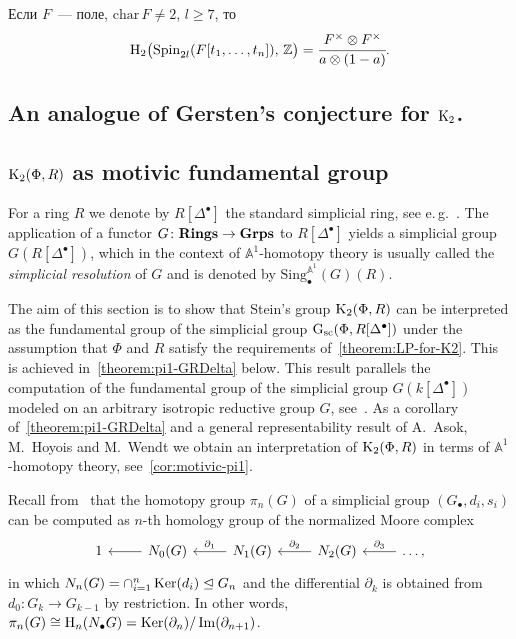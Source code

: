 \documentclass[oneside, 11pt]{amsart} \pdfoutput=1
\begin{document}
\begin{corollary}
Если $F$~--- поле, $\mathrm{char}\,F\neq2$, $l\geq7$, то
$$
\mathrm H_2\big(\mathrm{Spin}_{2l}(F[t_1,\ldots,t_n]),\,\mathbb Z\big)=\cfrac{F^\times\otimes F^\times}{a\otimes(1-a)}.
$$
\end{corollary}
\subsection{An analogue of Gersten's conjecture for ${\mathrm{K}}_2$.}

\subsection{\texorpdfstring{${\mathrm{K}}_2(\Phi, R)$}{K2(R)} as motivic fundamental group}
For a ring $R$ we denote by $R[\Delta^\bullet]$ the standard simplicial ring, see e.\,g.~\cite{Jar83}. The application of a functor $G\colon{\normalfont\textbf{Rings}}\rightarrow{\normalfont\textbf{Grps}}$ to $R[\Delta^\bullet]$ yields a simplicial group $G(R[\Delta^\bullet])$, which in the context of $\mathbb{A}^1$-homotopy theory is usually called the {\it simplicial resolution} of $G$ and is denoted by $\mathrm{Sing}^{\mathbb{A}^1}_\bullet(G)(R)$.

The aim of this section is to show that Stein's group ${\mathrm{K}}_2(\Phi, R)$ can be interpreted as the fundamental group of the simplicial group $\mathrm{G}_\mathrm{sc}(\Phi, R[\Delta^\bullet])$ under the assumption that $\Phi$ and $R$ satisfy the requirements of~\cref{theorem:LP-for-K2}. This is achieved in~\cref{theorem:pi1-GRDelta} below. This result parallels the computation of the fundamental group of the simplicial group $G(k[\Delta^\bullet])$ modeled on an arbitrary isotropic reductive group $G$, see~\cite[Proposition~3.2]{VW16}. As a corollary of~\cref{theorem:pi1-GRDelta} and a general representability result of A.~Asok, M.~Hoyois and M.~Wendt we obtain an interpretation of ${\mathrm{K}}_2(\Phi, R)$ in terms of $\mathbb{A}^1$-homotopy theory, see~\cref{cor:motivic-pi1}.

Recall from~\cite[\S~17]{May67} that the homotopy group $\pi_n(G)$ of a simplicial group $(G_\bullet, d_i, s_i)$ can be computed as $n$-th homology group of the normalized Moore complex 
\[\begin{tikzcd} 1 & N_0(G) \ar[l] & N_1(G) \ar{l}[swap]{\partial_1} & N_2(G) \ar{l}[swap]{\partial_2} & \ar{l}[swap]{\partial_3} \ldots, \end{tikzcd} \] 
in which $N_n(G) = \cap_{i=1}^n\mathop{\mathrm{Ker}}\nolimits(d_i) \trianglelefteq G_n$ and the differential $\partial_k$ is obtained from $d_0\colon G_k \to G_{k-1}$ by restriction. In other words, $\pi_n(G) \cong \mathrm{H}_n(N_\bullet G) = \mathop{\mathrm{Ker}}\nolimits(\partial_n) / \mathop{\mathrm{Im}}\nolimits(\partial_{n+1})$.
\end{document}
